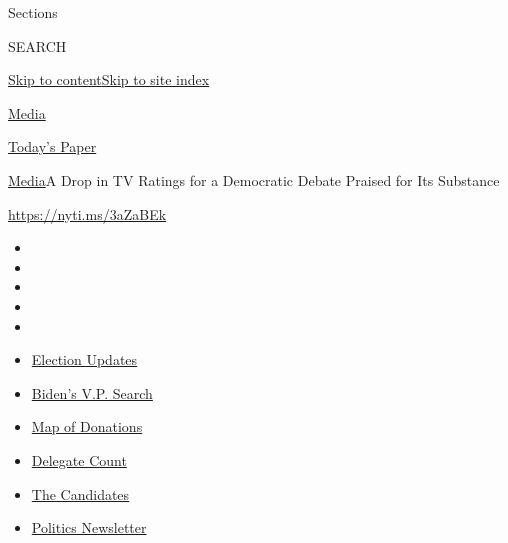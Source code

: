Sections

SEARCH

\protect\hyperlink{site-content}{Skip to
content}\protect\hyperlink{site-index}{Skip to site index}

\href{https://www.nytimes.com/section/business/media}{Media}

\href{https://myaccount.nytimes.com/auth/login?response_type=cookie\&client_id=vi}{}

\href{https://www.nytimes.com/section/todayspaper}{Today's Paper}

\href{/section/business/media}{Media}\textbar{}A Drop in TV Ratings for
a Democratic Debate Praised for Its Substance

\url{https://nyti.ms/3aZaBEk}

\begin{itemize}
\item
\item
\item
\item
\item
\end{itemize}

\begin{itemize}
\item
  \href{https://www.nytimes.com/2020/07/31/us/elections/biden-vs-trump.html?action=click\&pgtype=Article\&state=default\&region=TOP_BANNER\&context=storylines_menu}{Election
  Updates}
\item
  \href{https://www.nytimes.com/article/biden-vice-president-2020.html?action=click\&pgtype=Article\&state=default\&region=TOP_BANNER\&context=storylines_menu}{Biden's
  V.P. Search}
\item
  \href{https://www.nytimes.com/interactive/2020/07/24/us/politics/trump-biden-campaign-donors.html?action=click\&pgtype=Article\&state=default\&region=TOP_BANNER\&context=storylines_menu}{Map
  of Donations}
\item
  \href{https://www.nytimes.com/interactive/2020/us/elections/delegate-count-primary-results.html?action=click\&pgtype=Article\&state=default\&region=TOP_BANNER\&context=storylines_menu}{Delegate
  Count}
\item
  \href{https://www.nytimes.com/interactive/2019/us/politics/2020-presidential-candidates.html?action=click\&pgtype=Article\&state=default\&region=TOP_BANNER\&context=storylines_menu}{The
  Candidates}
\item
  \href{https://www.nytimes.com/newsletters/politics?action=click\&pgtype=Article\&state=default\&region=TOP_BANNER\&context=storylines_menu}{Politics
  Newsletter}
\end{itemize}

